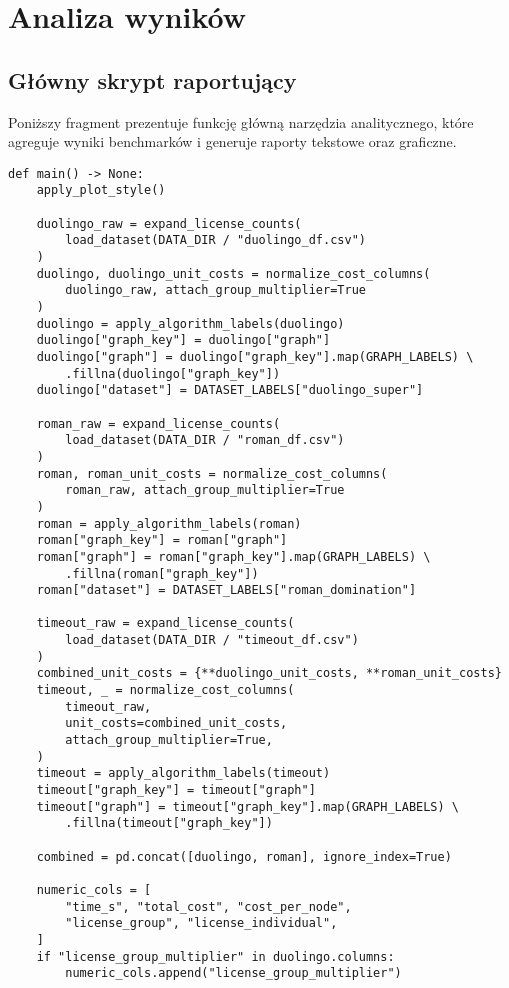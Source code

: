 \section{Analiza wyników}
\subsection{Główny skrypt raportujący}
Poniższy fragment prezentuje funkcję główną narzędzia analitycznego,
które agreguje wyniki benchmarków i generuje raporty tekstowe oraz
graficzne.

\begin{verbatim}
def main() -> None:
    apply_plot_style()

    duolingo_raw = expand_license_counts(
        load_dataset(DATA_DIR / "duolingo_df.csv")
    )
    duolingo, duolingo_unit_costs = normalize_cost_columns(
        duolingo_raw, attach_group_multiplier=True
    )
    duolingo = apply_algorithm_labels(duolingo)
    duolingo["graph_key"] = duolingo["graph"]
    duolingo["graph"] = duolingo["graph_key"].map(GRAPH_LABELS) \
        .fillna(duolingo["graph_key"])
    duolingo["dataset"] = DATASET_LABELS["duolingo_super"]

    roman_raw = expand_license_counts(
        load_dataset(DATA_DIR / "roman_df.csv")
    )
    roman, roman_unit_costs = normalize_cost_columns(
        roman_raw, attach_group_multiplier=True
    )
    roman = apply_algorithm_labels(roman)
    roman["graph_key"] = roman["graph"]
    roman["graph"] = roman["graph_key"].map(GRAPH_LABELS) \
        .fillna(roman["graph_key"])
    roman["dataset"] = DATASET_LABELS["roman_domination"]

    timeout_raw = expand_license_counts(
        load_dataset(DATA_DIR / "timeout_df.csv")
    )
    combined_unit_costs = {**duolingo_unit_costs, **roman_unit_costs}
    timeout, _ = normalize_cost_columns(
        timeout_raw,
        unit_costs=combined_unit_costs,
        attach_group_multiplier=True,
    )
    timeout = apply_algorithm_labels(timeout)
    timeout["graph_key"] = timeout["graph"]
    timeout["graph"] = timeout["graph_key"].map(GRAPH_LABELS) \
        .fillna(timeout["graph_key"])

    combined = pd.concat([duolingo, roman], ignore_index=True)

    numeric_cols = [
        "time_s", "total_cost", "cost_per_node",
        "license_group", "license_individual",
    ]
    if "license_group_multiplier" in duolingo.columns:
        numeric_cols.append("license_group_multiplier")


\end{verbatim}
